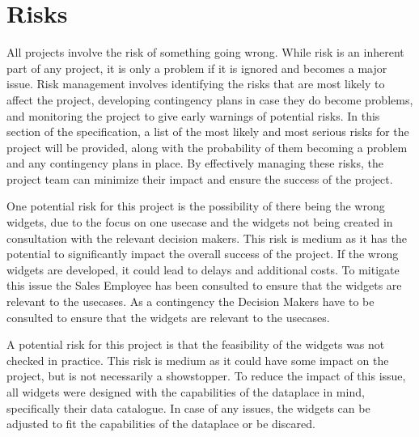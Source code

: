\chapter{Risks}

All projects involve the risk of something going wrong. While risk is an inherent part of any project, it is only a problem if it is ignored and becomes a major issue. Risk management involves identifying the risks that are most likely to affect the project, developing contingency plans in case they do become problems, and monitoring the project to give early warnings of potential risks. In this section of the specification, a list of the most likely and most serious risks for the project will be provided, along with the probability of them becoming a problem and any contingency plans in place. By effectively managing these risks, the project team can minimize their impact and ensure the success of the project.

One potential risk for this project is the possibility of there being the wrong \glspl{widget}, due to the focus on one \gls{usecase} and the \glspl{widget} not being created in consultation with the relevant decision makers. This risk is medium as it has the potential to significantly impact the overall success of the project. If the wrong \glspl{widget} are developed, it could lead to delays and additional costs. To mitigate this issue the Sales Employee has been consulted to ensure that the \glspl{widget} are relevant to the \glspl{usecase}. As a contingency the Decision Makers have to be consulted to ensure that the \glspl{widget} are relevant to the \glspl{usecase}.

A potential risk for this project is that the feasibility of the \glspl{widget} was not checked in practice. This risk is medium as it could have some impact on the project, but is not necessarily a showstopper. To reduce the impact of this issue, all \glspl{widget} were designed with the capabilities of the \gls{dataplace} in mind, specifically their data catalogue. In case of any issues, the \glspl{widget} can be adjusted to fit the capabilities of the \gls{dataplace} or be discared.

